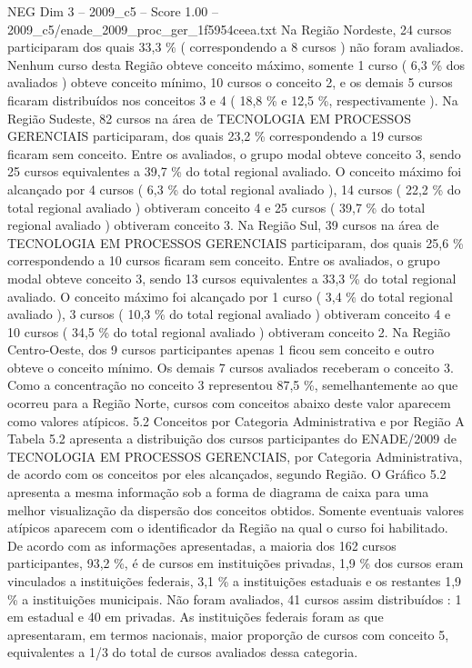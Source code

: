 \begin{textsample}{NEG Dim 3 – 2009\_c5 – Score 1.00 – 2009\_c5/enade\_2009\_proc\_ger\_1f5954ceea.txt}
Na Região Nordeste, 24 cursos participaram dos quais 33,3 \% ( correspondendo a 8 cursos ) não foram avaliados.
Nenhum curso desta Região obteve conceito máximo, somente 1 curso ( 6,3 \% dos avaliados ) obteve conceito mínimo, 10 cursos o conceito 2, e os demais 5 cursos ficaram distribuídos nos conceitos 3 e 4 ( 18,8 \% e 12,5 \%, respectivamente ).
Na Região Sudeste, 82 cursos na área de TECNOLOGIA EM PROCESSOS GERENCIAIS participaram, dos quais 23,2 \% correspondendo a 19 cursos ficaram sem conceito.
Entre os avaliados, o grupo modal obteve conceito 3, sendo 25 cursos equivalentes a 39,7 \% do total regional avaliado.
O conceito máximo foi alcançado por 4 cursos ( 6,3 \% do total regional avaliado ), 14 cursos ( 22,2 \% do total regional avaliado ) obtiveram conceito 4 e 25 cursos ( 39,7 \% do total regional avaliado ) obtiveram conceito 3.
Na Região Sul, 39 cursos na área de TECNOLOGIA EM PROCESSOS GERENCIAIS participaram, dos quais 25,6 \% correspondendo a 10 cursos ficaram sem conceito.
Entre os avaliados, o grupo modal obteve conceito 3, sendo 13 cursos equivalentes a 33,3 \% do total regional avaliado.
O conceito máximo foi alcançado por 1 curso ( 3,4 \% do total regional avaliado ), 3 cursos ( 10,3 \% do total regional avaliado ) obtiveram conceito 4 e 10 cursos ( 34,5 \% do total regional avaliado ) obtiveram conceito 2.
Na Região Centro-Oeste, dos 9 cursos participantes apenas 1 ficou sem conceito e outro obteve o conceito mínimo.
Os demais 7 cursos avaliados receberam o conceito 3.
Como a concentração no conceito 3 representou 87,5 \%, semelhantemente ao que ocorreu para a Região Norte, cursos com conceitos abaixo deste valor aparecem como valores atípicos. 5.2 Conceitos por Categoria Administrativa e por Região A Tabela 5.2 apresenta a distribuição dos cursos participantes do ENADE/2009 de TECNOLOGIA EM PROCESSOS GERENCIAIS, por Categoria Administrativa, de acordo com os conceitos por eles alcançados, segundo Região.
O Gráfico 5.2 apresenta a mesma informação sob a forma de diagrama de caixa para uma melhor visualização da dispersão dos conceitos obtidos.
Somente eventuais valores atípicos aparecem com o identificador da Região na qual o curso foi habilitado.
De acordo com as informações apresentadas, a maioria dos 162 cursos participantes, 93,2 \%, é de cursos em instituições privadas, 1,9 \% dos cursos eram vinculados a instituições federais, 3,1 \% a instituições estaduais e os restantes 1,9 \% a instituições municipais.
Não foram avaliados, 41 cursos assim distribuídos : 1 em estadual e 40 em privadas.
As instituições federais foram as que apresentaram, em termos nacionais, maior proporção de cursos com conceito 5, equivalentes a 1/3 do total de cursos avaliados dessa categoria.

\end{textsample}
